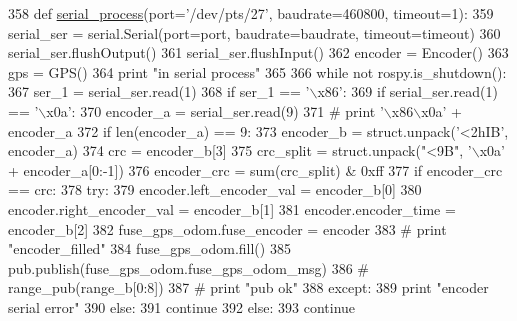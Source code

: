 \begin{DoxyCode}
358 \textcolor{keyword}{def }\hyperlink{namespaceserial__af__dox_a88369fbec8f4073e79e32dc236e5e282}{serial\_process}(port='/dev/pts/27', baudrate=460800, timeout=1):
359     serial\_ser = serial.Serial(port=port, baudrate=baudrate, timeout=timeout)
360     serial\_ser.flushOutput()
361     serial\_ser.flushInput()
362     encoder = Encoder()
363     gps = GPS()
364     \textcolor{keywordflow}{print} \textcolor{stringliteral}{"in serial process"}
365 
366     \textcolor{keywordflow}{while} \textcolor{keywordflow}{not} rospy.is\_shutdown():
367         ser\_1 = serial\_ser.read(1)
368         \textcolor{keywordflow}{if} ser\_1 == \textcolor{stringliteral}{'\(\backslash\)x86'}:
369             \textcolor{keywordflow}{if} serial\_ser.read(1) == \textcolor{stringliteral}{'\(\backslash\)x0a'}:
370                 encoder\_a = serial\_ser.read(9)
371                 \textcolor{comment}{# print '\(\backslash\)x86\(\backslash\)x0a' + encoder\_a}
372                 \textcolor{keywordflow}{if} len(encoder\_a) == 9:
373                     encoder\_b = struct.unpack(\textcolor{stringliteral}{'<2hIB'}, encoder\_a)
374                     crc = encoder\_b[3]
375                     crc\_split = struct.unpack(\textcolor{stringliteral}{"<9B"}, \textcolor{stringliteral}{'\(\backslash\)x0a'} + encoder\_a[0:-1])
376                     encoder\_crc = sum(crc\_split) & 0xff
377                     \textcolor{keywordflow}{if} encoder\_crc == crc:
378                         \textcolor{keywordflow}{try}:
379                             encoder.left\_encoder\_val = encoder\_b[0]
380                             encoder.right\_encoder\_val = encoder\_b[1]
381                             encoder.encoder\_time = encoder\_b[2]
382                             fuse\_gps\_odom.fuse\_encoder = encoder
383                             \textcolor{comment}{# print "encoder\_filled"}
384                             fuse\_gps\_odom.fill()
385                             pub.publish(fuse\_gps\_odom.fuse\_gps\_odom\_msg)
386                             \textcolor{comment}{# range\_pub(range\_b[0:8])}
387                             \textcolor{comment}{# print "pub ok"}
388                         \textcolor{keywordflow}{except}:
389                             \textcolor{keywordflow}{print} \textcolor{stringliteral}{"encoder serial error"}
390                     \textcolor{keywordflow}{else}:
391                         \textcolor{keywordflow}{continue}
392                 \textcolor{keywordflow}{else}:
393                     \textcolor{keywordflow}{continue}

\end{DoxyCode}
